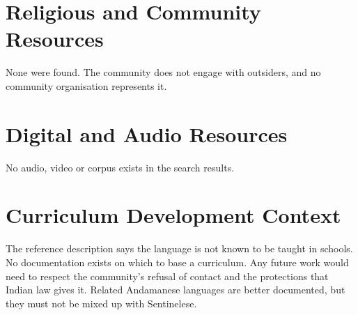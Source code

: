 \documentclass[12pt]{article}
\begin{document}
\section{Religious and Community Resources}
None were found. The community does not engage with outsiders, and no community organisation represents it.

\section{Digital and Audio Resources}
No audio, video or corpus exists in the search results.

\section{Curriculum Development Context}
The reference description says the language is not known to be taught in schools. No documentation exists on which to base a curriculum. Any future work would need to respect the community's refusal of contact and the protections that Indian law gives it. Related Andamanese languages are better documented, but they must not be mixed up with Sentinelese.
\end{document}

